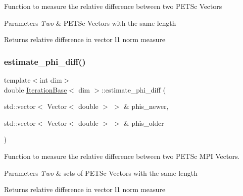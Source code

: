 Function to measure the relative difference between two P\+E\+T\+Sc Vectors


\begin{DoxyParams}{Parameters}
{\em Two} & P\+E\+T\+Sc Vectors with the same length \\
\hline
\end{DoxyParams}
\begin{DoxyReturn}{Returns}
relative difference in vector l1 norm measure 
\end{DoxyReturn}
\mbox{\label{class_iteration_base_aa929c0e69fd2566db98611b810354123}} 
\subsubsection{\texorpdfstring{estimate\+\_\+phi\+\_\+diff()}{estimate\_phi\_diff()}\hspace{0.1cm}{\footnotesize\ttfamily [3/4]}}
{\footnotesize\ttfamily template$<$int dim$>$ \\
double \hyperlink{class_iteration_base}{Iteration\+Base}$<$ dim $>$\+::estimate\+\_\+phi\+\_\+diff (\begin{DoxyParamCaption}\item[{std\+::vector$<$ Vector$<$ double $>$ $>$ \&}]{phis\+\_\+newer,  }\item[{std\+::vector$<$ Vector$<$ double $>$ $>$ \&}]{phis\+\_\+older }\end{DoxyParamCaption})\hspace{0.3cm}{\ttfamily [protected]}}

Function to measure the relative difference between two P\+E\+T\+Sc M\+PI Vectors.


\begin{DoxyParams}{Parameters}
{\em Two} & sets of P\+E\+T\+Sc Vectors with the same length \\
\hline
\end{DoxyParams}
\begin{DoxyReturn}{Returns}
relative difference in vector l1 norm measure 
\end{DoxyReturn}
\mbox{\label{class_iteration_base_ab46bde988ac6dc1b84ebb78665414785}} 
